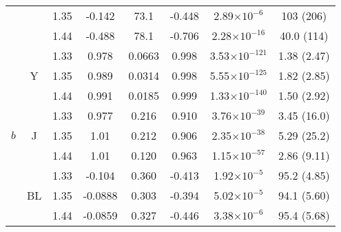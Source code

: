 \begin{subappendices}
\begin{table}[htb!]
\begin{tabular}{|ccc|ccccc|}
        & & 1.35 & -0.142 & 73.1 & -0.448 & 2.89$\times 10^{-6}$ & 103 (206) \\
        & & 1.44 & -0.488 & 78.1 & -0.706 & 2.28$\times 10^{-16}$ & 40.0 (114) \\
        \hline
        \multirow{9}{*}{$b$} & \multirow{3}{*}{Y} & 1.33 & 0.978 & 0.0663 & 0.998 & 3.53$\times 10^{-121}$ & 1.38 (2.47) \\
        & & 1.35 & 0.989 & 0.0314 & 0.998 & 5.55$\times 10^{-125}$ & 1.82 (2.85) \\
        & & 1.44 & 0.991 & 0.0185 & 0.999 & 1.33$\times 10^{-140}$ & 1.50 (2.92) \\
        \cline{2-8}
        & \multirow{3}{*}{J} & 1.33 & 0.977 & 0.216 & 0.910 & 3.76$\times 10^{-39}$ & 3.45 (16.0) \\
        & & 1.35 & 1.01 & 0.212 & 0.906 & 2.35$\times 10^{-38}$ & 5.29 (25.2) \\
        & & 1.44 & 1.01 & 0.120 & 0.963 & 1.15$\times 10^{-57}$ & 2.86 (9.11) \\
        \cline{2-8}
        & \multirow{3}{*}{BL} & 1.33 & -0.104 & 0.360 & -0.413 & 1.92$\times 10^{-5}$ & 95.2 (4.85) \\
        & & 1.35 & -0.0888 & 0.303 & -0.394 & 5.02$\times 10^{-5}$ & 94.1 (5.60) \\
        & & 1.44 & -0.0859 & 0.327 & -0.446 & 3.38$\times 10^{-6}$ & 95.4 (5.68) \\
        \hline
    \end{tabular}    \label{tb:singleparamtrendsfull}
\end{table}


\end{subappendices}
